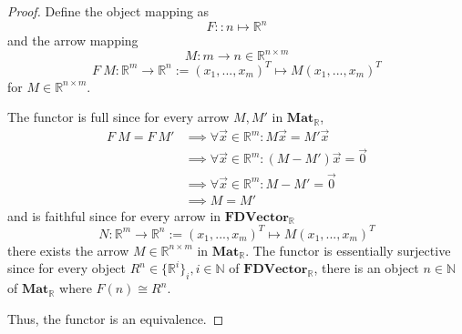 \documentclass[11pt]{article} %
\theoremstyle{definition}
\begin{document}
\begin{proof}
  Define the object mapping as 
  \[F:: n \mapsto \mathbb{R}^n\]
  and the arrow mapping
  \[M:m\rightarrow n \in \mathbb{R}^{n\times m}\]
  \[F\ M : \mathbb{R}^m \rightarrow \mathbb{R}^n := (x_1,...,x_m)^T \mapsto M(x_1,...,x_m)^T\]
  for $M\in\mathbb{R}^{n\times m}$.
  
  The functor is full since for every arrow $M,M'$ in $\textbf{Mat}_{\mathbb{R}}$,
\begin{equation}
\begin{aligned}
  F\ M = F\ M' &\implies \forall \vec{x}\in \mathbb{R}^m : M\vec{x} = M'\vec{x}\\
  &\implies \forall \vec{x}\in \mathbb{R}^m : (M-M')\vec{x}=\vec{0}\\
  &\implies \forall \vec{x}\in \mathbb{R}^m : M-M'=\vec{0}\\
  &\implies M = M'
\end{aligned}
\end{equation}
  and is faithful since for every arrow in $\textbf{FDVector}_{\mathbb{R}}$
  \[N:\mathbb{R}^m \rightarrow \mathbb{R}^n:= (x_1,...,x_m)^T \mapsto M(x_1,...,x_m)^T\]
  there exists the arrow $M\in \mathbb{R}^{n\times m}$ in $\textbf{Mat}_{\mathbb{R}}$.
  The functor is essentially surjective since 
  for every object $R^n\in\{\mathbb{R}^i\}_i,i\in\mathbb{N}$ of $\textbf{FDVector}_{\mathbb{R}}$,
  there is an object $n\in\mathbb{N}$ of $\textbf{Mat}_{\mathbb{R}}$ where $F(n)\cong R^n$.
  
  Thus, the functor is an equivalence.
\end{proof}
\end{document}
